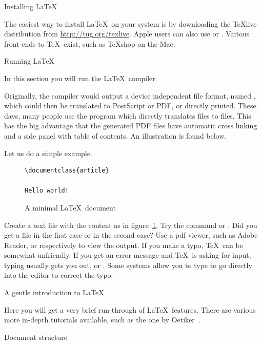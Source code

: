 
 {Installing \LaTeX}

The easiest way to install \LaTeX\ on your system is by downloading
the \TeX{}live distribution from \url{http://tug.org/texlive}. Apple
users can also use  or . Various front-ends to
\TeX\ exist, such as \TeX{}shop on the Mac.

 {Running \LaTeX}

\begin{purpose}
In this section you will run the \LaTeX\ compiler  
\end{purpose}

Originally, the  compiler would output a device independent
file format, named , which could then be translated to
PostScript or PDF, or directly printed. These days, many people use
the  program which directly translates  files to
 files. This has the big advantage that the generated PDF
files have automatic cross linking and a side panel with table of
contents. An illustration is found below.

Let us do a simple example.
\begin{figure}[ht]
\begin{verbatim}
\documentclass{article}

Hello world!

\end{verbatim}
  \caption{A minimal \LaTeX\ document}
  \label{fig:minimaldoc}
\end{figure}
\practical
{Create a text file  with the content as in
  figure~\ref{fig:minimaldoc}. Try the command  or
  . Did you get a file  in the first
  case or  in the second case? Use a pdf viewer, such
  as Adobe Reader, or
   respectively to view the output.}  
{}
{If you make a typo, \TeX\ can be somewhat unfriendly. If you get an
  error message and \TeX\ is asking for input, typing 
  usually gets you out, or . Some systems allow you to type
   to go directly into the editor to correct the typo.}

 {A gentle introduction to LaTeX}

Here you will get a very brief run-through of \LaTeX\ features. There
are various more in-depth tutorials available, such as the one by
Oetiker~\cite{Oetiker:LaTeXintro}.

 {Document structure}

